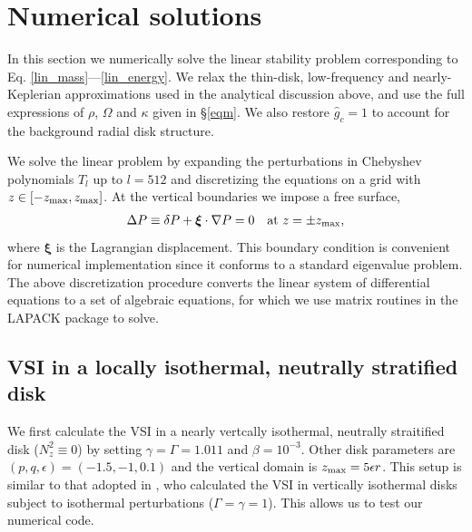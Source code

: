 \section{Numerical solutions}
In this section we numerically solve the linear stability problem
corresponding to Eq. \ref{lin_mass}---\ref{lin_energy}. 
We relax the thin-disk, low-frequency and nearly-Keplerian
approximations used in the analytical discussion above, and  
use the full expressions of $\rho$, $\Omega$ and
$\kappa$ given in \S\ref{eqm}. We also restore $\hat{g}_c=1$ to
account for the background radial disk structure.  


We solve the linear problem by expanding the
perturbations in Chebyshev polynomials $T_l$ up to $l=512$
and discretizing the equations on a grid with
$z\in[-z_\mathrm{max},z_\mathrm{max}]$. At the vertical boundaries we impose a free
surface, 
\begin{align}
  \Delta P \equiv \delta P + \bm{\xi}\cdot\nabla P= 0 \quad \text{at } z=\pm z_\mathrm{max},
\end{align}
where $\bm{\xi}$ is the Lagrangian displacement. This boundary
condition is convenient for numerical implementation since it conforms
to a standard eigenvalue problem. The above discretization procedure
converts the linear system of differential equations to a set of 
algebraic equations, for which we use matrix routines in the LAPACK
package to solve. 


\subsection{VSI in a locally isothermal, neutrally stratified disk}\label{vertiso_pertiso} 
We first calculate the VSI in a nearly vertcally isothermal, neutrally
straitified disk ($N_z^2\equiv0$) by setting
$\gamma=\Gamma=1.011$ and $\beta=10^{-3}$. Other disk parameters are 
$(p,q,\epsilon)=(-1.5,-1,0.1)$ and the vertical domain is $z_\mathrm{max} =
5\epsilon r$. This setup is similar to that adopted in
\cite{mcnally14}, who calculated the VSI in vertically isothermal
disks subject to isothermal perturbations ($\Gamma=\gamma=1$).  This
allows us to test our numerical code.  

